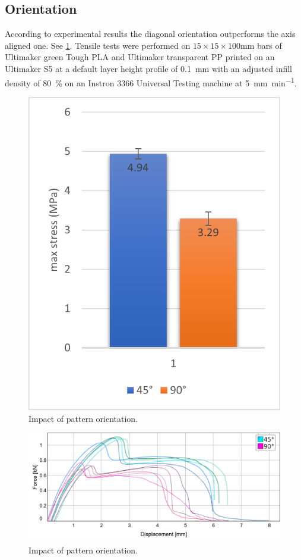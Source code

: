 \subsection{Orientation}
According to experimental results the diagonal orientation outperforms the axis aligned one.
See \cref{graph:45vs90}.
Tensile tests were performed on $15\times15\times100$\si{\milli\meter} bars of Ultimaker green Tough PLA and Ultimaker transparent PP
printed on an Ultimaker S5 at a default layer height profile of \SI{0.1}{\milli\meter} with an adjusted infill density of \SI{80}{\percent}
on an Instron 3366 Universal Testing machine at \SI{5}{\milli\meter\per\minute}.


\begin{figure}
	\centering
	\includegraphics[height=.66\columnwidth]{sources/testing/45vs90.png}
	\caption{Impact of pattern orientation.}
	\label{graph:45vs90}
\end{figure}


\begin{figure}
	\centering
	\includegraphics[height=.66\columnwidth]{sources/testing/45vs90_stress_strain.png}
	\caption{Impact of pattern orientation.}
	\label{graph:45vs90_stress_strain}
\end{figure}
